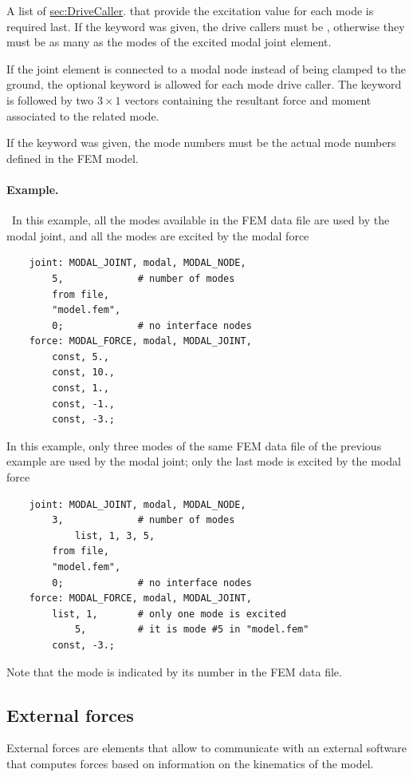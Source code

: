 A list of
\hyperref{\kw{drive callers}}{\kw{drive callers} (see Section~}{)}{sec:DriveCaller}.
that provide the excitation value for each mode is required last.
If the keyword  was given, the drive callers
must be , otherwise they must be as many
as the modes of the excited modal joint element.

If the  joint element is connected to a modal node
instead of being clamped to the ground, the optional keyword 
is allowed for each mode drive caller.
The keyword  is followed by two $3\times 1$ vectors
containing the resultant force and moment associated to the related mode.

If the keyword  was given, the mode numbers must be
the actual mode numbers defined in the FEM model.

\paragraph{Example.} \
In this example, all the modes available in the FEM data file 
are used by the modal joint, and all the modes are excited
by the modal force
\begin{verbatim}
    joint: MODAL_JOINT, modal, MODAL_NODE,
        5,             # number of modes
        from file,
        "model.fem",
        0;             # no interface nodes
    force: MODAL_FORCE, modal, MODAL_JOINT,
        const, 5.,
        const, 10.,
        const, 1.,
        const, -1.,
        const, -3.;
\end{verbatim}

In this example, only three modes of the same FEM data file
of the previous example are used by the modal joint;
only the last mode is excited by the modal force
\begin{verbatim}
    joint: MODAL_JOINT, modal, MODAL_NODE,
        3,             # number of modes
            list, 1, 3, 5,
        from file,
        "model.fem",
        0;             # no interface nodes
    force: MODAL_FORCE, modal, MODAL_JOINT,
        list, 1,       # only one mode is excited
            5,         # it is mode #5 in "model.fem"
        const, -3.;
\end{verbatim}
Note that the mode is indicated by its number in the FEM data file.




\subsection{External forces}
External forces are elements that allow to communicate
with an external software that computes forces
based on information on the kinematics of the model.

